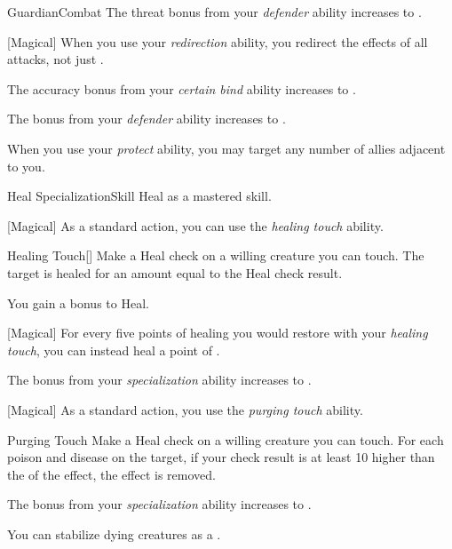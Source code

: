 \begin{feat}{Guardian}{Combat}
         The threat bonus from your \textit{defender} ability increases to .

        [Magical] When you use your \textit{redirection} ability, you redirect the effects of all attacks, not just .

         The accuracy bonus from your \textit{certain bind} ability increases to .

         The bonus from your \textit{defender} ability increases to .

         When you use your \textit{protect} ability, you may target any number of allies adjacent to you.
    \end{feat}

    \begin{feat}{Heal Specialization}{Skill}
        \featpre Heal as a mastered skill.

        [Magical] As a standard action, you can use the \textit{healing touch} ability.
        \begin{ability}{Healing Touch}[]
            Make a Heal check on a willing creature you can touch.
            The target is healed for an amount equal to the Heal check result.
        \end{ability}

         You gain a  bonus to Heal.

        [Magical] For every five points of healing you would restore with your \textit{healing touch}, you can instead heal a point of .

         The bonus from your \textit{specialization} ability increases to .

        [Magical] As a standard action, you use the \textit{purging touch} ability.
        \begin{ability}{Purging Touch}
            Make a Heal check on a willing creature you can touch.
            For each poison and disease on the target, if your check result is at least 10 higher than the  of the effect, the effect is removed.
        \end{ability}

         The bonus from your \textit{specialization} ability increases to .

         You can stabilize dying creatures as a .
    \end{feat}

